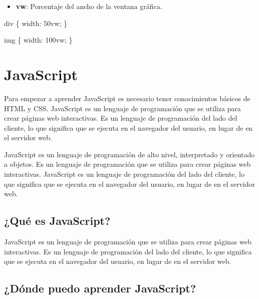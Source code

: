 \documentclass[
  a4paper,
  DIV=11,
  numbers=noendperiod,
  onepage,
  openany]{scrreprt}
\newenvironment{Shaded}{\begin{snugshade}}{\end{snugshade}}
\newcommand{\DataTypeTok}[1]{\textcolor[rgb]{0.68,0.00,0.00}{#1}}
\newcommand{\DecValTok}[1]{\textcolor[rgb]{0.68,0.00,0.00}{#1}}
\newcommand{\KeywordTok}[1]{\textcolor[rgb]{0.00,0.23,0.31}{#1}}
\newcommand{\NormalTok}[1]{\textcolor[rgb]{0.00,0.23,0.31}{#1}}
\newcommand{\OperatorTok}[1]{\textcolor[rgb]{0.37,0.37,0.37}{#1}}
\providecommand{\tightlist}{%
  \setlength{\itemsep}{0pt}\setlength{\parskip}{0pt}}\usepackage{longtable,booktabs,array}
\begin{document}
\begin{itemize}
\tightlist
\item
  \textbf{vw}: Porcentaje del ancho de la ventana gráfica.
\end{itemize}

\begin{Shaded}
\begin{Highlighting}[]
\NormalTok{div \{}
  \KeywordTok{width}\NormalTok{: }\DecValTok{50}\DataTypeTok{vw}\OperatorTok{;}
\NormalTok{\}}

\NormalTok{img \{}
  \KeywordTok{width}\NormalTok{: }\DecValTok{100}\DataTypeTok{vw}\OperatorTok{;}
\NormalTok{\}}
\end{Highlighting}
\end{Shaded}

\chapter{JavaScript}\label{javascript}

Para empezar a aprender JavaScript es necesario tener conocimientos
básicos de HTML y CSS. JavaScript es un lenguaje de programación que se
utiliza para crear páginas web interactivas. Es un lenguaje de
programación del lado del cliente, lo que significa que se ejecuta en el
navegador del usuario, en lugar de en el servidor web.

JavaScript es un lenguaje de programación de alto nivel, interpretado y
orientado a objetos. Es un lenguaje de programación que se utiliza para
crear páginas web interactivas. JavaScript es un lenguaje de
programación del lado del cliente, lo que significa que se ejecuta en el
navegador del usuario, en lugar de en el servidor web.

\section{¿Qué es JavaScript?}\label{quuxe9-es-javascript}

JavaScript es un lenguaje de programación que se utiliza para crear
páginas web interactivas. Es un lenguaje de programación del lado del
cliente, lo que significa que se ejecuta en el navegador del usuario, en
lugar de en el servidor web.

\section{¿Dónde puedo aprender
JavaScript?}\label{duxf3nde-puedo-aprender-javascript}
\end{document}
